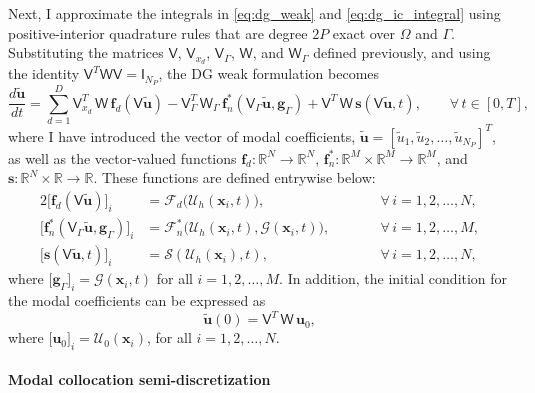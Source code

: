 \documentclass[pdflatex,sn-mathphys-num]{sn-jnl}%
\theoremstyle{thmstyleone}%
\theoremstyle{thmstyletwo}%
\theoremstyle{thmstylethree}%
\newcommand{\mat}[1]{\ensuremath{\mathsf{#1}}}
\newcommand{\fnc}[1]{\ensuremath{\mathcal{#1}}}
\begin{document}
Next, I approximate the integrals in \eqref{eq:dg_weak} and \eqref{eq:dg_ic_integral} using positive-interior quadrature rules that are degree $2P$ exact over $\Omega$ and $\Gamma$.  Substituting the matrices $\mat{V}$, $\mat{V}_{x_d}$, $\mat{V}_\Gamma$, $\mat{W}$, and $\mat{W}_{\Gamma}$ defined previously, and using the identity $\mat{V}^T \mat{W} \mat{V} = \mat{I}_{N_P}$, the DG weak formulation becomes
\begin{equation}\label{eq:dg}
    \frac{d \tilde{\bm{u}}}{dt} = \sum_{d=1}^D \mat{V}_{x_d}^T\, \mat{W} \,\bm{f}_{d}(\mat{V} \tilde{\bm{u}}) - \mat{V}_{\Gamma}^T \,\mat{W}_\Gamma \,\bm{f}^*_n(\mat{V}_{\Gamma} \tilde{\bm{u}}, \bm{g}_{\Gamma}) + \mat{V}^T \,\mat{W} \,\bm{s}(\mat{V}\tilde{\bm{u}},t),\qquad\forall\, t \in [0,T],
\end{equation}
where I have introduced the vector of modal coefficients, $\tilde{\bm{u}} = [\tilde{u}_1, \tilde{u}_2, \ldots, \tilde{u}_{N_P}]^T$, as well as the vector-valued functions $\bm{f}_{d} : \mathbb{R}^{N} \rightarrow \mathbb{R}^{N}$, $\bm{f}_n^* : \mathbb{R}^{M} \times \mathbb{R}^{M} \rightarrow \mathbb{R}^{M}$, and $\bm{s} : \mathbb{R}^{N} \times \mathbb{R} \rightarrow \mathbb{R}$.  These functions are defined entrywise below:
\begin{alignat}{2} 
\big[ \bm{f}_{d}(\mat{V} \tilde{\bm{u}}) \big]_i &= \fnc{F}_{d}\big(\fnc{U}_h(\bm{x}_i,t) \big),& \qquad &\forall\, i = 1,2,\ldots,N, \label{eq:fxd_def}\\
\big[ \bm{f}^*_n(\mat{V}_\Gamma \tilde{\bm{u}},\bm{g}_\Gamma) \big]_i &=
\fnc{F}^*_n\big( \fnc{U}_h(\bm{x}_i,t), \fnc{G}(\bm{x}_i,t) \big), & \qquad &\forall\, i = 1,2,\ldots,M, \label{eq:fstar_def} \\
\big[ \bm{s}(\mat{V} \tilde{\bm{u}},t) \big]_i &= \fnc{S}(\fnc{U}_h(\bm{x}_i),t),& \qquad &\forall\, i = 1,2,\ldots,N, \label{eq:s_def}
\end{alignat}
where $\big[ \bm{g}_\Gamma \big]_i = \fnc{G}(\bm{x}_i,t)$ for all $i=1,2,\ldots,M$.  In addition, the initial condition for the modal coefficients can be expressed as
\begin{equation}\label{eq:dg_ic}
\tilde{\bm{u}}(0) = \mat{V}^T \,\mat{W} \,\bm{u}_0, 
\end{equation}
where $\big[ \bm{u}_0 \big]_i = \fnc{U}_0(\bm{x}_i)$, for all $i = 1,2,\ldots, N$.

\paragraph{Modal collocation semi-discretization}
\end{document}
